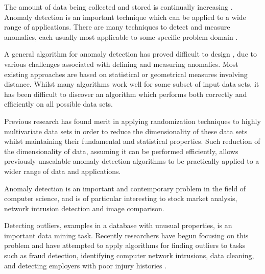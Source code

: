The amount of data being collected and stored is continually increasing
\cite{Vries:2011}. Anomaly detection is an important technique which can be
applied to a wide range of applications. There are many techniques to detect and
measure anomalies, each usually most applicable to some specific problem domain
\citeNeeded{}.

A general algorithm for anomaly detection has proved difficult to design
\citeNeeded{}, due to various challenges associated with defining and measuring
anomalies. Most existing approaches are based on statistical or geometrical
measures involving distance. Whilst many algorithms work well for some subset of
input data sets, it has been difficult to discover an algorithm which performs
both correctly and efficiently on all possible data sets.

Previous research has found merit in applying randomization techniques to highly
multivariate data sets in order to reduce the dimensionality of these data sets
whilst maintaining their fundamental and statistical properties. Such reduction
of the dimensionality of data, assuming it can be performed efficiently, allows
previously-unscalable anomaly detection algorithms to be practically applied to
a wider range of data and applications.

Anomaly detection is an important and contemporary problem in the field of
computer science, and is of particular interesting to stock market analysis,
network intrusion detection and image comparison.

Detecting outliers, examples in a database with unusual properties, is an important data mining task. Recently researchers have begun focusing on this problem and have attempted to apply algorithms for finding outliers to tasks such as fraud detection, identifying computer network intrusions, data cleaning, and detecting employers with poor injury histories \cite{Bay:2003}.
